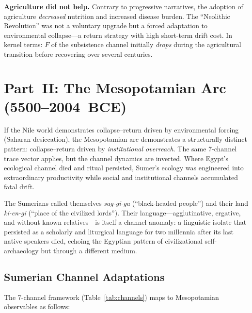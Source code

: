 \documentclass[
  aps,
  prd,
  twocolumn,
  superscriptaddress,
  nofootinbib,
  floatfix
]{revtex4-2}
\begin{document}
\textbf{Agriculture did not help.}  Contrary to
progressive narratives, the adoption of agriculture
\emph{decreased} nutrition and increased disease
burden.  The ``Neolithic Revolution'' was not a
voluntary upgrade but a forced adaptation to
environmental collapse---a return strategy with high
short-term drift cost.  In kernel terms: $F$ of the
subsistence channel initially \emph{drops} during the
agricultural transition before recovering over
several centuries.


\section{Part~II: The Mesopotamian Arc
(5500--2004~BCE)}\label{sec:sumer}

If the Nile world demonstrates collapse--return driven
by environmental forcing (Saharan desiccation), the
Mesopotamian arc demonstrates a structurally distinct
pattern: collapse--return driven by \emph{institutional
overreach}.  The same 7-channel trace vector applies,
but the channel dynamics are inverted.  Where Egypt's
ecological channel died and ritual persisted, Sumer's
ecology was engineered into extraordinary productivity
while social and institutional channels accumulated
fatal drift.

The Sumerians called themselves \emph{sag-gi-ga}
(``black-headed people'') and their land
\emph{ki-en-gi} (``place of the civilized lords'').
Their language---agglutinative, ergative, and without
known relatives---is itself a channel anomaly: a
linguistic isolate that persisted as a scholarly and
liturgical language for two millennia after its last
native speakers died, echoing the Egyptian pattern of
civilizational self-archaeology but through a
different medium.

\subsection{Sumerian Channel Adaptations}\label{sec:sumer-channels}

The 7-channel framework (Table~\ref{tab:channels})
maps to Mesopotamian observables as follows:
\end{document}

